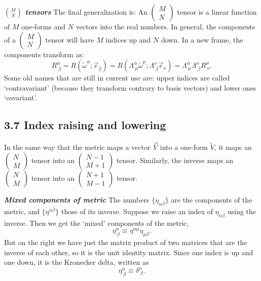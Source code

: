 \documentclass[12pt]{book}
\begin{document}
    \textit{\textbf{\(\binom{M}{N}\) tensors}}
    The final generalization is:
    An \(\left(\begin{array}{c} M \\ N \end{array}\right)\) tensor is a linear function of \(M\) one-forms and \(N\) vectors into the real numbers.
    In general, the components of a \(\left(\begin{array}{c} M \\ N \end{array}\right)\) tensor will have \(M\) indices up and \(N\) down. In a new frame, the components transform as:
    \[
    R^{\bar{\alpha}}_{\ \bar{\beta}} = R(\tilde{\omega}^{\bar{\alpha}}; \vec{e}_{\bar{\beta}})
    = R\left(\Lambda^{\bar{\alpha}}_{\ \mu} \tilde{\omega}^{\mu}; \Lambda^{\nu}_{\ \bar{\beta}} \vec{e}_{\nu}\right)
    = \Lambda^{\bar{\alpha}}_{\ \mu} \Lambda^{\nu}_{\ \bar{\beta}} R^{\mu}_{\ \nu}. \tag{3.55}
    \]
    Some old names that are still in current use are: upper indices are called ‘contravariant’ (because they transform contrary to basis vectors) and lower ones ‘covariant’.

    \subsection{3.7 Index raising and lowering}
    In the same way that the metric maps a vector \(\vec{V}\) into a one-form \(\tilde{V}\), it maps an \(\left(\begin{array}{c} N \\ M \end{array}\right)\) tensor into an \(\left(\begin{array}{c} N-1 \\ M+1 \end{array}\right)\) tensor. Similarly, the inverse maps an \(\left(\begin{array}{c} N \\ M \end{array}\right)\) tensor into an \(\left(\begin{array}{c} N+1 \\ M-1 \end{array}\right)\) tensor.

    \textit{\textbf{Mixed components of metric}}
    The numbers \(\{\eta_{\alpha\beta}\}\) are the components of the metric, and \(\{\eta^{\alpha\beta}\}\) those of its inverse. Suppose we raise an index of \(\eta_{\alpha\beta}\) using the inverse. Then we get the ‘mixed’ components of the metric,
    \[
    \eta^\alpha_{\ \beta} \equiv \eta^{\alpha\mu} \eta_{\mu\beta}. \tag{3.59}
    \]
    But on the right we have just the matrix product of two matrices that are the inverse of each other, so it is the unit identity matrix. Since one index is up and one down, it is the Kronecker delta, written as
    \[
    \eta^\alpha_{\ \beta} \equiv \delta^\alpha_{\ \beta}. \tag{3.60}
    \]
\end{document}

